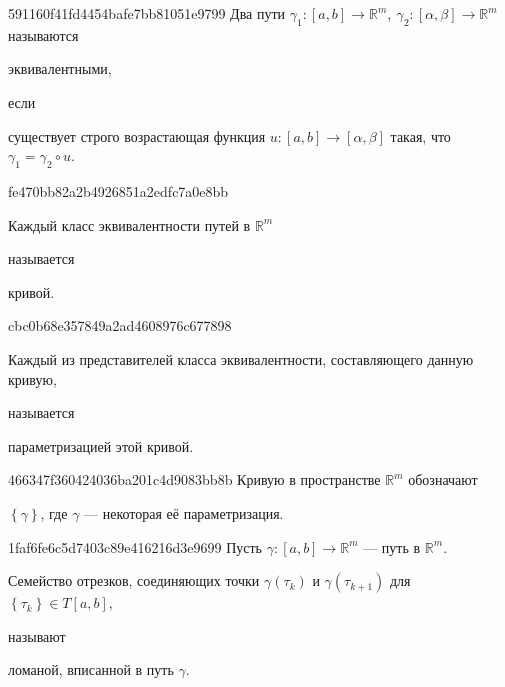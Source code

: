 \begin{note}{591160f41fd4454bafe7bb81051e9799}
    Два пути \({ \gamma_1 : [a, b] \to \mathbb R^{m},\: \gamma_2 : [\alpha, \beta] \to \mathbb R^{m} }\) называются \begin{icloze}{2}эквивалентными,\end{icloze} если \begin{icloze}{1}существует строго возрастающая функция \({ u : [a, b] \to [\alpha, \beta] }\) такая, что \({ \gamma_1 = \gamma_2 \circ u }\).\end{icloze}
\end{note}

\begin{note}{fe470bb82a2b4926851a2edfc7a0e8bb}
    \begin{icloze}{2}Каждый класс эквивалентности путей в \({ \mathbb R^{m} }\)\end{icloze} называется \begin{icloze}{1}кривой.\end{icloze}
\end{note}

\begin{note}{cbc0b68e357849a2ad4608976c677898}
    \begin{icloze}{2}Каждый из представителей класса эквивалентности, составляющего данную кривую,\end{icloze} называется \begin{icloze}{1}параметризацией этой кривой.\end{icloze}
\end{note}

\begin{note}{466347f360424036ba201c4d9083bb8b}
    Кривую в пространстве \({ \mathbb R^{m} }\) обозначают \begin{icloze}{1}\({ \left\{ \gamma \right\} }\), где \({ \gamma }\) --- некоторая её параметризация.\end{icloze}
\end{note}

\begin{note}{1faf6fe6c5d7403c89e416216d3e9699}
    Пусть \({ \gamma : [a, b] \to \mathbb R^{m} }\) --- путь в \({ \mathbb R^{m} }\).
    \begin{icloze}{1}Семейство отрезков, соединяющих точки \({ \gamma(\tau_k) }\) и \({ \gamma(\tau_{k + 1}) }\) для \({ \left\{ \tau_k \right\} \in T[a, b] }\),\end{icloze} называют \begin{icloze}{2}ломаной, вписанной в путь \({ \gamma }\).\end{icloze}
\end{note}


